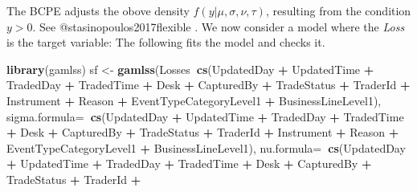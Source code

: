 \documentclass[]{article}
\newenvironment{Shaded}{\begin{snugshade}}{\end{snugshade}}
\newcommand{\KeywordTok}[1]{\textcolor[rgb]{0.13,0.29,0.53}{\textbf{#1}}}
\newcommand{\DataTypeTok}[1]{\textcolor[rgb]{0.13,0.29,0.53}{#1}}
\newcommand{\StringTok}[1]{\textcolor[rgb]{0.31,0.60,0.02}{#1}}
\newcommand{\OperatorTok}[1]{\textcolor[rgb]{0.81,0.36,0.00}{\textbf{#1}}}
\newcommand{\NormalTok}[1]{#1}
\begin{document}
\doublespacing

The BCPE adjusts the obove density \(f(y|\mu,\sigma,\nu,\tau)\),
resulting from the condition \(y>0\). See @stasinopoulos2017flexible .
We now consider a model where the \emph{Loss} is the target variable:
The following fits the model and checks it.\medskip

\singlespacing

\doublespacing

\singlespacing

\begin{Shaded}
\begin{Highlighting}[]
\KeywordTok{library}\NormalTok{(gamlss)}
\NormalTok{sf <-}\StringTok{ }\KeywordTok{gamlss}\NormalTok{(Losses}\OperatorTok{~}\KeywordTok{cs}\NormalTok{(UpdatedDay }\OperatorTok{+}\StringTok{ }\NormalTok{UpdatedTime }\OperatorTok{+}\StringTok{ }\NormalTok{TradedDay }\OperatorTok{+}
\StringTok{                }\NormalTok{TradedTime }\OperatorTok{+}\StringTok{ }\NormalTok{Desk }\OperatorTok{+}\StringTok{ }\NormalTok{CapturedBy }\OperatorTok{+}\StringTok{ }\NormalTok{TradeStatus }
               \OperatorTok{+}\StringTok{ }\NormalTok{TraderId }\OperatorTok{+}\StringTok{ }\NormalTok{Instrument }\OperatorTok{+}\StringTok{ }\NormalTok{Reason }\OperatorTok{+}\StringTok{ }
\StringTok{                 }\NormalTok{EventTypeCategoryLevel1 }\OperatorTok{+}\StringTok{ }\NormalTok{BusinessLineLevel1), }
\DataTypeTok{sigma.formula=}\OperatorTok{~}\KeywordTok{cs}\NormalTok{(UpdatedDay }\OperatorTok{+}\StringTok{ }\NormalTok{UpdatedTime }\OperatorTok{+}\StringTok{ }\NormalTok{TradedDay }\OperatorTok{+}\StringTok{ }
\StringTok{                }\NormalTok{TradedTime }\OperatorTok{+}\StringTok{ }\NormalTok{Desk }\OperatorTok{+}\StringTok{ }\NormalTok{CapturedBy }\OperatorTok{+}\StringTok{ }\NormalTok{TradeStatus }
               \OperatorTok{+}\StringTok{ }\NormalTok{TraderId }\OperatorTok{+}\StringTok{ }\NormalTok{Instrument }\OperatorTok{+}\StringTok{ }\NormalTok{Reason }\OperatorTok{+}\StringTok{ }
\StringTok{               }\NormalTok{EventTypeCategoryLevel1 }\OperatorTok{+}\StringTok{ }\NormalTok{BusinessLineLevel1),}
\DataTypeTok{nu.formula=}\OperatorTok{~}\KeywordTok{cs}\NormalTok{(UpdatedDay }\OperatorTok{+}\StringTok{ }\NormalTok{UpdatedTime }\OperatorTok{+}\StringTok{ }\NormalTok{TradedDay }\OperatorTok{+}\StringTok{ }\NormalTok{TradedTime}
               \OperatorTok{+}\StringTok{ }\NormalTok{Desk }\OperatorTok{+}\StringTok{ }\NormalTok{CapturedBy }\OperatorTok{+}\StringTok{ }\NormalTok{TradeStatus }\OperatorTok{+}\StringTok{ }\NormalTok{TraderId }\OperatorTok{+}\StringTok{ }

\end{Highlighting}
\end{Shaded}
\end{document}
